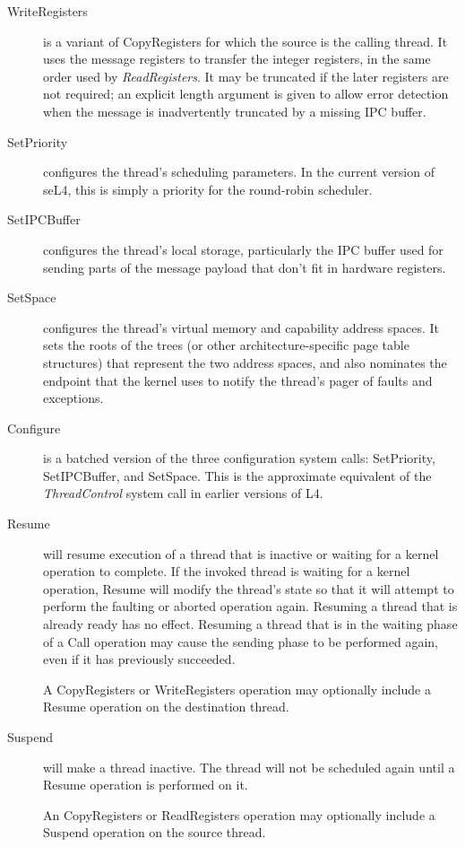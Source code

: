 \begin{description}
\item [WriteRegisters] is a variant of CopyRegisters for which the source is the calling thread. It uses the message registers to transfer the integer registers, in the same order used by \emph{ReadRegisters}. It may be truncated if the later registers are not required; an explicit length argument is given to allow error detection when the message is inadvertently truncated by a missing IPC buffer.

\item [SetPriority] configures the thread's scheduling parameters. In the current version of seL4, this is simply a priority for the round-robin scheduler.

\item [SetIPCBuffer] configures the thread's local storage, particularly the IPC buffer used for sending parts of the message payload that don't fit in hardware registers.

\item [SetSpace] configures the thread's virtual memory and capability address spaces. It sets the roots of the trees (or other architecture-specific page table structures) that represent the two address spaces, and also nominates the endpoint that the kernel uses to notify the thread's pager of faults and exceptions.

\item [Configure] is a batched version of the three configuration system calls: SetPriority, SetIPCBuffer, and SetSpace. This is the approximate equivalent of the \emph{ThreadControl} system call in earlier versions of L4.

\item[Resume] will resume execution of a thread that is inactive or waiting
for a kernel operation to complete. If the invoked thread is waiting for a
kernel operation, Resume will modify the thread's state so that it will attempt
to perform the faulting or aborted operation again. Resuming a thread that is
already ready has no effect. Resuming a thread that is in the waiting phase of
a Call operation may cause the sending phase to be performed again, even if
it has previously succeeded.

A CopyRegisters or WriteRegisters operation may optionally include a Resume operation on the destination thread.

\item[Suspend] will make a thread inactive. The thread will not be scheduled
again until a Resume operation is performed on it.

An CopyRegisters or ReadRegisters operation may optionally include a Suspend operation on the source thread.
\end{description}

